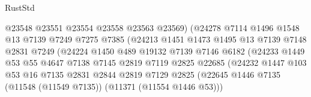 \begin{lexlean}{RustStd}
\begin{coremodule}
                                  @23548
                                  @23551
                                  @23554
                                  @23558
                                  @23563
                                  @23569)
                                (@24278
                                  @7114
                                  @1496
                                  @1548
                                  @13
                                  @7139
                                  @7249
                                  @7275
                                  @7385
                                  (@24213
                                    @1451
                                    @1473
                                    @1495
                                    @13
                                    @7139
                                    @7148
                                    @2831
                                    @7249
                                    (@24224
                                      @1450
                                      @489
                                      @19132
                                      @7139
                                      @7146
                                      @6182
                                      (@24233
                                        @1449
                                        @53
                                        @55
                                        @4647
                                        @7138
                                        @7145
                                        @2819
                                        @7119
                                        @2825
                                        @22685
                                        (@24232
                                          @1447
                                          @103
                                          @53
                                          @16
                                          @7135
                                          @2831
                                          @2844
                                          @2819
                                          @7129
                                          @2825
                                          (@22645
                                            @1446
                                            @7135
                                            (@11548 (@11549 @7135))
                                            (@11371 (@11554 @1446 @53)))

\end{coremodule}
\end{lexlean}
